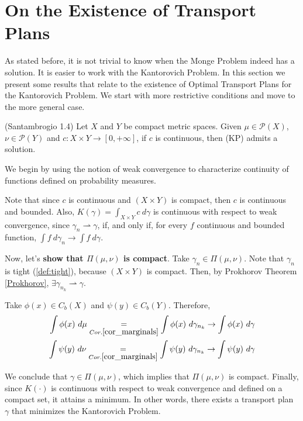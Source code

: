 \section{On the Existence of Transport Plans}
As stated before, it is not trivial to know when the Monge Problem
indeed has a solution. It is easier to work with the Kantorovich
Problem. In this section we present some results that relate
to the existence of Optimal Transport Plans for the Kantorovich Problem.
We start with more restrictive conditions and move to the more general case.

\begin{theorem}(Santambrogio 1.4)
  Let $X$ and $Y$ be compact metric spaces.
  Given $\mu\in \mathcal{P}(X)$, $\nu \in \mathcal P(Y)$ and
  $c:X\times Y \to[0,+\infty]$, if $c$ is continuous, then
  (KP) admits a solution.
  \label{thm:Santambrogio1.4}
\end{theorem}
\begin{prf}
  We begin by using the notion of weak convergence to characterize
  continuity of functions defined on probability measures.

  Note that since $c$ is continuous and $(X \times Y)$ is compact,
  then $c$ is continuous and bounded. Also,
  $K(\gamma) = \int_{X\times Y}c \ d\gamma$ is continuous with respect to weak
  convergence, since
  $\gamma_n \rightharpoonup \gamma$, if, and only if, for every $f$ continuous
  and bounded function, $\int f \ d\gamma_n \to \int f \ d\gamma$.

  Now, let's \textbf{show that $\Pi(\mu,\nu)$ is compact}.
  Take $\gamma_n \in \Pi(\mu,\nu)$. Note that $\gamma_n$ is tight (\ref{def:tight}),
  because $(X\times Y)$ is compact. Then, by Prokhorov Theorem \ref{Prokhorov},
  $\exists \gamma_{n_k} \rightharpoonup \gamma$.

  Take $\phi(x) \in C_b(X)$ and $\psi(y) \in C_b(Y)$. Therefore,
  \begin{equation*}
    \begin{split}
      \int \phi(x) \ d\mu
      \underset{Cor.\ref{cor_marginals}}{=}
      \int\phi(x)\ d\gamma_{n_k}
      \to
      \int \phi(x) \ d\gamma \\
      \int \psi(y) \ d\nu
      \underset{Cor.\ref{cor_marginals}}{=}
      \int\psi(y)\ d\gamma_{n_k}
      \to
      \int \psi(y) \ d\gamma
    \end{split}
  \end{equation*}

  We conclude that $\gamma \in \Pi(\mu,\nu)$, which implies that
  $\Pi(\mu,\nu)$ is compact. Finally, since $K(\cdot)$ is continuous with respect to weak convergence
  and defined on a compact set, it attains a minimum. In other words,
  there exists a transport plan $\gamma$ that minimizes the Kantorovich
  Problem.

\end{prf}


